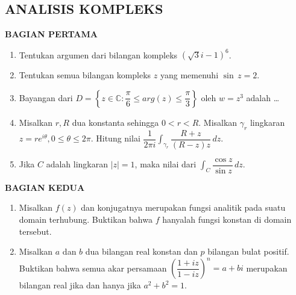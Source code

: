 \documentclass[12pt,twoside]{article}
\begin{document}
\subsection{ANALISIS KOMPLEKS}
\textbf{BAGIAN PERTAMA}
\begin{enumerate}
	\item Tentukan argumen dari bilangan kompleks $\left(\sqrt{3}i -1 \right)^6$.

	\item Tentukan semua bilangan kompleks $z$ yang memenuhi $\sin \, z = 2$.

	\item Bayangan dari $D = \left\lbrace z \in \mathbb{C} : \dfrac{\pi}{6} \leq arg(z) \leq \dfrac{\pi}{3} \right\rbrace$ oleh $w = z^3$ adalah \dots

	\item Misalkan $r,R$ dua konstanta sehingga $0 < r< R$. Misalkan $\gamma_r$ lingkaran $z = re^{i\theta}, 0 \leq \theta \leq 2\pi$. Hitung nilai $\displaystyle \dfrac{1}{2\pi i} \int_{\gamma_r}^{} \dfrac{R+z}{(R-z)z}\,dz$.

	\item Jika $C$ adalah lingkaran $|z|=1$, maka nilai dari $\displaystyle\int_{C} \dfrac{\cos z}{\sin z}\,dz$.
	      \newpage
\end{enumerate}
\newpage \textbf{BAGIAN KEDUA}
\begin{enumerate}
	\item Misalkan $f(z)$ dan konjugatnya merupakan fungsi analitik pada suatu domain
	      terhubung. Buktikan bahwa $f$ hanyalah fungsi konstan di domain tersebut.

	\item Misalkan $a$ dan $b$ dua bilangan real konstan dan $p$ bilangan bulat positif. Buktikan bahwa semua akar persamaan $\left(\dfrac{1+iz}{1-iz}\right)^n = a+bi$ merupakan bilangan real jika dan hanya jika $a^2 + b^2 = 1.$
\end{enumerate}
\pagebreak
\end{document}
